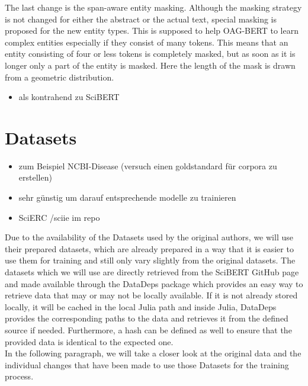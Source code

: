 	The last change is the span-aware entity masking. Although the masking strategy is not changed for either the abstract or the actual text, special masking is proposed for the new entity types. This is supposed to help OAG-BERT to learn complex entities especially if they consist of many tokens. This means that an entity consisting of four or less tokens is completely masked, but as soon as it is longer only a part of the entity is masked. Here the length of the mask is drawn from a geometric distribution.   
\color{ForestGreen}
\begin{itemize}
	\item als kontrahend zu SciBERT \cite{Liu2021}
\end{itemize}

\section{Datasets}
\begin{itemize}
	\item zum Beispiel NCBI-Disease (versuch einen goldstandard für corpora zu erstellen)
	\item sehr günstig um darauf entsprechende modelle zu trainieren \cite{Dogan2014}
	\item SciERC /sciie im repo \cite{luan2018multitask}
\end{itemize}
\color{black}
Due to the availability of the Datasets used by the original authors, we will use their prepared datasets, which are already prepared in a way that it is easier to use them for training and still only vary slightly from the original datasets. The datasets which we will use are directly retrieved from the SciBERT GitHub page and made available through the DataDeps package which provides an easy way to retrieve data that may or may not be locally available. If it is not already stored locally, it will be cached in the local Julia path and inside Julia, DataDeps provides the corresponding paths to the data and retrieves it from the defined source if needed. Furthermore, a hash can be defined as well to ensure that the provided data is identical to the expected one.\cite{White2019}\\
In the following paragraph, we will take a closer look at the original data and the individual changes that have been made to use those Datasets for the training process.
